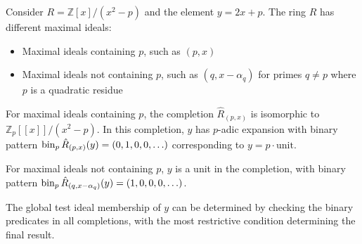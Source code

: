 \begin{example}\label{ex:non-complete-calculation}
Consider $R = \mathbb{Z}[x]/(x^2-p)$ and the element $y = 2x + p$. The ring $R$ has different maximal ideals:
\begin{itemize}
    \item Maximal ideals containing $p$, such as $(p, x)$
    \item Maximal ideals not containing $p$, such as $(q, x-\alpha_q)$ for primes $q \neq p$ where $p$ is a quadratic residue
\end{itemize}

For maximal ideals containing $p$, the completion $\hat{R}_{(p,x)}$ is isomorphic to $\mathbb{Z}_p[[x]]/(x^2-p)$. In this completion, $y$ has $p$-adic expansion with binary pattern $\operatorname{bin}_p{\hat{R}_{(p,x)}}(y) = (0, 1, 0, 0, \ldots)$ corresponding to $y = p \cdot \text{unit}$.

For maximal ideals not containing $p$, $y$ is a unit in the completion, with binary pattern $\operatorname{bin}_p{\hat{R}_{(q,x-\alpha_q)}}(y) = (1, 0, 0, 0, \ldots)$.

The global test ideal membership of $y$ can be determined by checking the binary predicates in all completions, with the most restrictive condition determining the final result.
\end{example}

